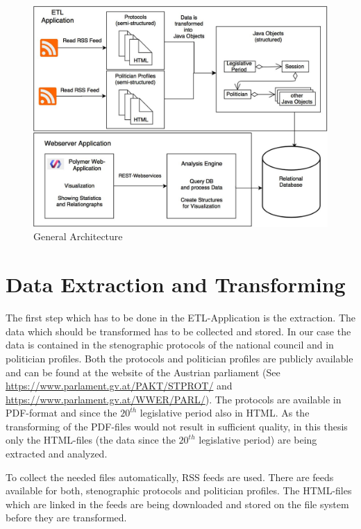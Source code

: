 \begin{figure}
	\centering
	\includegraphics[width=\textwidth]{imgs/overall_architecture}
	\caption{General Architecture}
	\label{fig:general_architecture}
\end{figure}

\section{Data Extraction and Transforming}
\label{sec:data_extraction_transforming}
The first step which has to be done in the ETL-Application is the extraction. The data which should be transformed has to be collected and stored. In our case the data is contained in the stenographic protocols of the national council and in politician profiles. Both the protocols and politician profiles are publicly available and can be found at the website of the Austrian parliament (See \url{https://www.parlament.gv.at/PAKT/STPROT/} and \url{https://www.parlament.gv.at/WWER/PARL/}). The protocols are available in PDF-format and since the $20^{th}$ legislative period also in HTML. As the transforming of the PDF-files would not result in sufficient quality, in this thesis only the HTML-files (the data since the $20^{th}$ legislative period) are being extracted and analyzed.

To collect the needed files automatically, RSS feeds are used. There are feeds available for both, stenographic protocols and politician profiles. The HTML-files which are linked in the feeds are being downloaded and stored on the file system before they are transformed.

